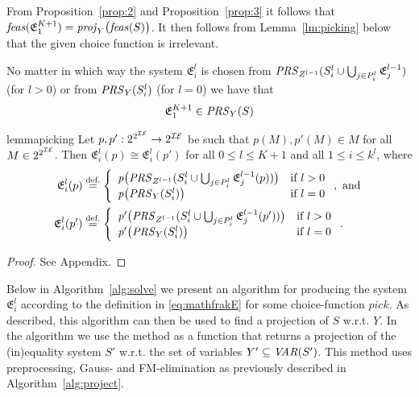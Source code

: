 From Proposition~\ref{prop:2} and Proposition~\ref{prop:3} it follows that $\mathit{feas}(\mathfrak{E}^{K+1}_1)=\mathit{proj}_Y\big(\mathit{feas}(S)\big)$. It then follows from Lemma~\ref{lm:picking} below that the given choice function is irrelevant.

\begin{cor}
No matter in which way the system $\mathfrak{E}^l_i$ is chosen from $\mathit{PRS}_{Z^{l-1}}(S^l_i \cup\bigcup_{j\in P^l_i}\mathfrak{E}^{l-1}_j)$ (for $l>0$) or from $\mathit{PRS}_{Y}(S^l_i)$ (for $l=0$) we have that 
\[
\mathfrak{E}^{K+1}_1 \in \mathit{PRS}_{Y}(S)
\]
\end{cor}
%
\begin{restatable}{lemma}{picking}\label{lm:picking}
Let $p,p':2^{2^{\mathcal{IE}}}\to 2^{\mathcal{IE}}$ be such that $p(M),p'(M)\in M$ for all $M\in 2^{2^{\mathcal{IE}}}$. Then $\mathfrak{E}^l_i(p)\cong\mathfrak{E}^l_i(p')$ for all $0\leq l\leq K+1$ and all $1\leq i\leq k^l$, where
\begin{align*}
\mathfrak{E}^l_i(p) &\overset{\text{def.}}= \left\{\begin{array}{ll}
		\mathit{p}\big(\mathit{PRS}_{Z^{l-1}}(S^l_i \cup\bigcup_{j\in P^l_i}\mathfrak{E}^{l-1}_j(p))\big) &\text{if }l>0\\
		\mathit{p}\big(\mathit{PRS}_{Y}(S^l_i)\big)&\text{if } l = 0
\end{array}\right.,\text{ and }\\
\mathfrak{E}^l_i(p') &\overset{\text{def.}}= \left\{\begin{array}{ll}
		\mathit{p'}\big(\mathit{PRS}_{Z^{l-1}}(S^l_i \cup\bigcup_{j\in P^l_i}\mathfrak{E}^{l-1}_j(p'))\big) &\text{if }l>0\\
		\mathit{p'}\big(\mathit{PRS}_{Y}(S^l_i)\big)&\text{if } l = 0
\end{array}\right..
\end{align*}
\end{restatable}
\begin{proof}
See Appendix.
\end{proof}
%
Below in Algorithm~\ref{alg:solve} we present an algorithm for producing the system $\mathfrak{E}^l_i$ according to the definition in \eqref{eq:mathfrakE} for some choice-function $\mathit{pick}$. As described, this algorithm can then be used to  find a projection of $S$ w.r.t. $Y$. In the algorithm we use the method  as a function that returns a projection of the (in)equality system $S'$ w.r.t. the set of variables $Y'\subseteq\mathit{VAR}(S')$. This method uses preprocessing, Gauss- and FM-elimination as previously described in Algorithm~\ref{alg:project}. 

